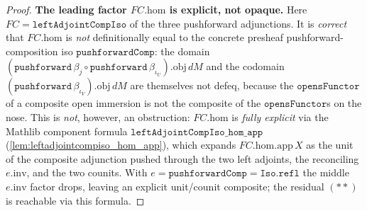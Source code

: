 \begin{proof}
  \textbf{The leading factor \(FC.\mathrm{hom}\) is explicit, not opaque.} Here
  \(FC = \mathtt{leftAdjointCompIso}\) of the three pushforward adjunctions. It is \emph{correct} that
  \(FC.\mathrm{hom}\) is \emph{not} definitionally equal to the concrete presheaf pushforward-composition
  iso \(\mathtt{pushforwardComp}\): the domain
  \((\mathtt{pushforward}\,\beta_j \circ \mathtt{pushforward}\,\beta_{\iota_U}).\mathrm{obj}\,dM\) and the
  codomain \((\mathtt{pushforward}\,\beta_{\iota_V}).\mathrm{obj}\,dM\) are themselves not defeq, because
  the \(\mathtt{opensFunctor}\) of a composite open immersion is not the composite of the
  \(\mathtt{opensFunctor}\)s on the nose. This is \emph{not}, however, an obstruction: \(FC.\mathrm{hom}\)
  is \emph{fully explicit} via the Mathlib component formula
  \(\mathtt{leftAdjointCompIso\_hom\_app}\) (\cref{lem:leftadjointcompiso_hom_app}), which expands
  \(FC.\mathrm{hom}.\mathrm{app}\,X\) as the unit of the composite adjunction pushed through the two left
  adjoints, the reconciling \(e.\mathrm{inv}\), and the two counits. With
  \(e = \mathtt{pushforwardComp} = \mathtt{Iso.refl}\) the middle \(e.\mathrm{inv}\) factor drops, leaving
  an explicit unit/counit composite; the residual \((**)\) is reachable via this formula.


\end{proof}
